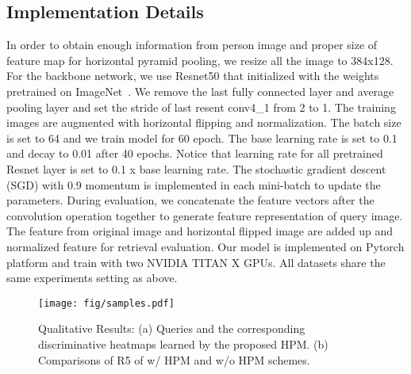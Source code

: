 \documentclass[letterpaper]{article} \usepackage{aaai19}  \usepackage{times}  \usepackage{helvet}  \usepackage{courier}  \usepackage{url}  \usepackage{graphicx}  \frenchspacing  \setlength{\pdfpagewidth}{8.5in}  \setlength{\pdfpageheight}{11in}  \usepackage{multirow}
\begin{document}
\subsection{Implementation Details}
In order to obtain enough information from person image and proper size of feature map for horizontal pyramid pooling, we resize all the image to 384x128. For the backbone network, we use Resnet50 that initialized with the weights pretrained on ImageNet~\cite{deng2009imagenet}. We remove the last fully connected layer and average pooling layer and set the stride of last resent conv4\_{1} from 2 to 1. The training images are augmented with horizontal flipping and normalization. The batch size is set to 64 and we train model for 60 epoch. The base learning rate is set to 0.1 and decay to 0.01 after 40 epochs. Notice that learning rate for all pretrained Resnet layer is set to 0.1 x base learning rate. The stochastic gradient descent (SGD) with 0.9 momentum is implemented in each mini-batch to update the parameters. During evaluation, we concatenate the feature vectors after the  convolution operation together to generate feature representation of query image.  The feature from original image and horizontal flipped image are added up and normalized feature for retrieval evaluation. Our model is implemented on Pytorch platform and train with two NVIDIA TITAN X GPUs. All datasets share the same experiments setting as above. 

\begin{figure}
	\centering
	\texttt{[image: fig/samples.pdf]}
	\caption{Qualitative Results: (a) Queries and the corresponding discriminative heatmaps learned by the proposed HPM. (b) Comparisons of R5 of w/ HPM and w/o HPM schemes.}
	\label{fig:samples}
	\vspace{-5mm}
\end{figure}
\end{document}
